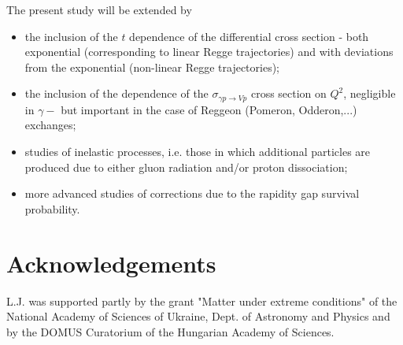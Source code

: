 \documentclass[12pt]{article}
\begin{document}
The present study will be extended by
\begin{itemize}
\item the inclusion of the $t$ dependence of the differential cross section - both exponential (corresponding to linear Regge trajectories) and with deviations from the exponential 
(non-linear Regge trajectories);
\item the inclusion of the dependence of the $\sigma_{\gamma p \rightarrow V p}$ cross section on $Q^2$, negligible in $\gamma-$ but important in the case of Reggeon (Pomeron, Odderon,...) exchanges;
\item studies of inelastic processes, i.e. those in which additional particles are produced due to either gluon radiation and/or proton dissociation;
\item more advanced studies of corrections due to the rapidity gap survival probability.
\end{itemize}


 \section*{Acknowledgements}
L.J. was supported partly by the grant "Matter under extreme conditions" of the
National Academy of Sciences of Ukraine, Dept. of Astronomy and
Physics and by the DOMUS Curatorium of the Hungarian Academy of Sciences.
\end{document}
